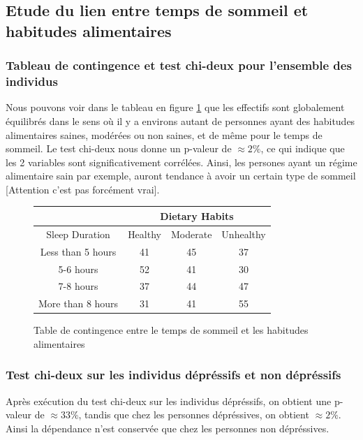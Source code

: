 \subsection{Etude du lien entre temps de sommeil et habitudes alimentaires}

\subsubsection{Tableau de contingence et test chi-deux pour l'ensemble des individus}

Nous pouvons voir dans le tableau en figure \ref{tab:contTableDietarySleepAll} que les effectifs sont globalement équilibrés dans le sens où il y a environs autant de personnes ayant des habitudes alimentaires saines, modérées ou non saines, et de même pour le temps de sommeil. 
Le test chi-deux nous donne un p-valeur de $\approx 2\%$, ce qui indique que les 2 variables sont significativement corrélées. Ainsi, les persones ayant un régime alimentaire sain par exemple, auront tendance à avoir un certain type de sommeil [Attention c'est pas forcément vrai].

\begin{figure}[!h]
    \begin{center}
      \begin{tabular}{|c|c|c|c|}
        \hline 
        & \multicolumn{3}{|c|}{Dietary Habits}\\ 
        \hline
        Sleep Duration & Healthy & Moderate & Unhealthy\\
        \hline 
        Less than 5 hours & 41 & 45 & 37 \\ 
        \hline 
        5-6 hours & 52 & 41 & 30\\
        \hline 
        7-8 hours & 37 & 44 & 47\\
        \hline 
        More than 8 hours & 31 & 41 & 55\\
        \hline
      \end{tabular}
    \end{center}
    \caption{Table de contingence entre le temps de sommeil et les habitudes alimentaires}
    \label{tab:contTableDietarySleepAll}
\end{figure}  

\subsubsection{Test chi-deux sur les individus dépréssifs et non dépréssifs}

Après exécution du test chi-deux sur les individus dépréssifs, on obtient une p-valeur de $\approx 33\%$, tandis que chez les personnes dépréssives, on obtient $\approx 2\%$. Ainsi la dépendance n'est conservée que chez les personnes non dépréssives. 

